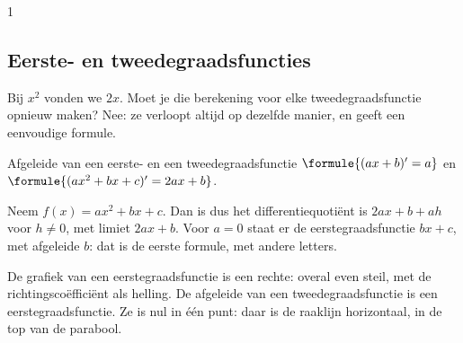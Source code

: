 \begin{oefeningen}
\end{oefeningen}

\begin{alleenvoor}{1}
\subsection{Eerste- en tweedegraadsfuncties}

Bij $x^2$ vonden we $2x$. Moet je die berekening voor elke tweedegraadsfunctie opnieuw maken? Nee: ze verloopt altijd op dezelfde manier, en geeft een eenvoudige formule.

\begin{theorie}
\begin{stelling}{Afgeleide van een eerste- en een tweedegraadsfunctie}
$\formule{(ax + b)' = a}$ \qquad en \qquad $\formule{(ax^2 + bx + c)' = 2ax + b}$.
\end{stelling}
\begin{bewijs}
Neem $f(x) = ax^2 + bx + c$. Dan is
dus het differentiequotiënt is $2ax + b + ah$ voor $h \neq 0$, met limiet $2ax + b$. Voor $a = 0$ staat er de eerstegraadsfunctie $bx + c$, met afgeleide $b$: dat is de eerste formule, met andere letters.
\end{bewijs}
\end{theorie}

De grafiek van een eerstegraadsfunctie is een rechte: overal even steil, met de richtingscoëfficiënt als helling. De afgeleide van een tweedegraadsfunctie is een eerstegraadsfunctie. Ze is nul in één punt: daar is de raaklijn horizontaal, in de top van de parabool.


\begin{oefeningen}
\end{oefeningen}
\end{alleenvoor}

